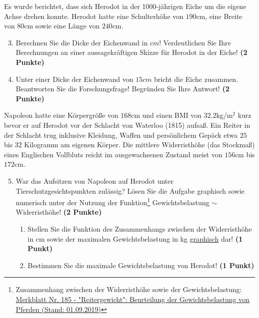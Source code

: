 \documentclass[a4paper, 9pt]{scrartcl}\usepackage[]{graphicx}\usepackage[]{xcolor}
\begin{document}
Es wurde berichtet, dass sich Herodot in der 1000-jährigen Eiche um die eigene Achse drehen konnte. Herodot hatte eine Schulterhöhe von $190$cm, eine Breite von $80$cm sowie eine Länge von $240$cm.

\begin{enumerate}
  \setcounter{enumi}{2}
\item Berechnen Sie die Dicke der Eichenwand in $cm$! Verdeutlichen Sie Ihre Berechnungen an einer aussagekräftigen Skizze für Herodot in der Eiche! \textbf{(2 Punkte)} 
\item Unter einer Dicke der Eichenwand von $15cm$ bricht die Eiche zusammen. Beantworten Sie die Forschungsfrage! Begründen Sie Ihre Antwort! \textbf{(2 Punkte)} 
\end{enumerate}

Napoleon hatte eine Körpergröße von $168$cm und einen BMI von $32.2$kg/m$^2$ kurz bevor er auf Herodot vor der Schlacht von Waterloo (1815) aufsaß. Ein Reiter in der Schlacht trug inklusive Kleidung, Waffen und persönlichem Gepäck etwa $25$ bis $32$ Kilogramm am eigenen Körper. Die mittlere Widerristhöhe (das Stockmaß) eines Englischen Vollbluts reicht im ausgewachsenen Zustand meist von $156$cm bis  $172$cm.

\begin{enumerate}
  \setcounter{enumi}{4}
\item War das Aufsitzen von Napoleon auf Herodot unter Tierschutzgesichtspunkten zulässig? Lösen Sie die Aufgabe graphisch sowie numerisch unter der Nutzung der Funktion\footnote{Zusammenhang zwischen der Widerristhöhe sowie der Gewichtsbelastung: \href{https://www.tierschutz-tvt.de/alle-merkblaetter-und-stellungnahmen/}{Merkblatt Nr. 185 - "Reitergewicht": Beurteilung der Gewichtsbelastung von Pferden (Stand: 01.09.2019)}} Gewichtsbelastung $\sim$ Widerristhöhe! \textbf{(2 Punkte)}
\begin{enumerate}
\item Stellen Sie die Funktion des Zusammenhangs zwischen der Widerristhöhe in cm sowie der maximalen Gewichtsbelastung in kg \uline{graphisch} dar! \textbf{(1 Punkt)}
\item Bestimmen Sie die maximale Gewichtsbelastung von Herodot! \textbf{(1 Punkt)}
\end{enumerate}
\end{enumerate}



 
\clearpage
\end{document}
